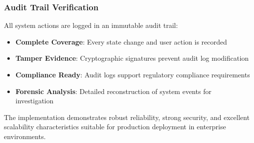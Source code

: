 \subsubsection{Audit Trail Verification}

All system actions are logged in an immutable audit trail:

\begin{itemize}
    \item \textbf{Complete Coverage}: Every state change and user action is recorded
    \item \textbf{Tamper Evidence}: Cryptographic signatures prevent audit log modification
    \item \textbf{Compliance Ready}: Audit logs support regulatory compliance requirements
    \item \textbf{Forensic Analysis}: Detailed reconstruction of system events for investigation
\end{itemize}

The implementation demonstrates robust reliability, strong security, and excellent scalability characteristics suitable for production deployment in enterprise environments. 